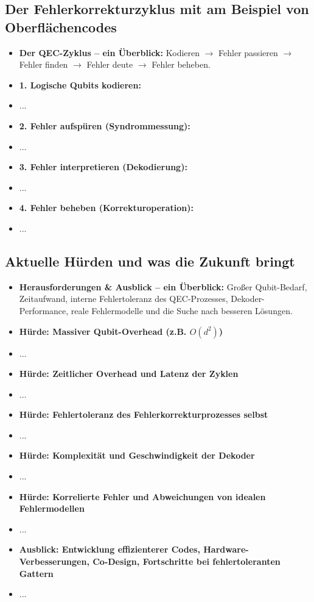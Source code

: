 \subsection{Der Fehlerkorrekturzyklus mit am Beispiel von Oberflächencodes}
\begin{itemize}
    \item \textbf{Der QEC-Zyklus -- ein Überblick:} Kodieren $\rightarrow$ Fehler passieren $\rightarrow$ Fehler finden $\rightarrow$ Fehler deute $\rightarrow$ Fehler beheben.
    \item \textbf{1. Logische Qubits kodieren:}
    \item ...
    \item \textbf{2. Fehler aufspüren (Syndrommessung):}
    \item ...
    \item \textbf{3. Fehler interpretieren (Dekodierung):}
    \item ...
    \item \textbf{4. Fehler beheben (Korrekturoperation):}
    \item ...
\end{itemize}

\subsection{Aktuelle Hürden und was die Zukunft bringt}
\begin{itemize}
    \item \textbf{Herausforderungen \& Ausblick -- ein Überblick:} Großer Qubit-Bedarf, Zeitaufwand, interne Fehlertoleranz des QEC-Prozesses, Dekoder-Performance, reale Fehlermodelle und die Suche nach besseren Lösungen.
    \item \textbf{Hürde: Massiver Qubit-Overhead (z.B. $O(d^2)$)}
    \item ...
    \item \textbf{Hürde: Zeitlicher Overhead und Latenz der Zyklen}
    \item ...
    \item \textbf{Hürde: Fehlertoleranz des Fehlerkorrekturprozesses selbst}
    \item ...
    \item \textbf{Hürde: Komplexität und Geschwindigkeit der Dekoder}
    \item ...
    \item \textbf{Hürde: Korrelierte Fehler und Abweichungen von idealen Fehlermodellen}
    \item ...
    \item \textbf{Ausblick: Entwicklung effizienterer Codes, Hardware-Verbesserungen, Co-Design, Fortschritte bei fehlertoleranten Gattern}
    \item ...
\end{itemize}

